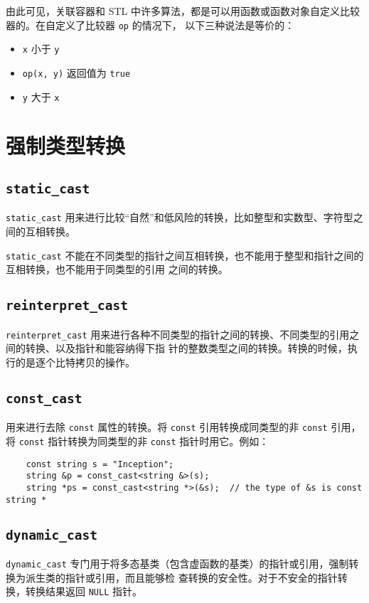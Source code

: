 \documentclass[UTF8]{ctexart}
\begin{document}
由此可见，关联容器和 STL 中许多算法，都是可以用函数或函数对象自定义比较器的。在自定义了比较器 \texttt{op} 的情况下，
以下三种说法是等价的：
\begin{itemize}
    \item \texttt{x} 小于 \texttt{y}
    \item \texttt{op(x, y)} 返回值为 \texttt{true}
    \item \texttt{y} 大于 \texttt{x}
\end{itemize}

\section{强制类型转换}
\subsection{\texttt{static\_cast}}
\texttt{static\_cast} 用来进行比较“自然”和低风险的转换，比如整型和实数型、字符型之间的互相转换。

\texttt{static\_cast} 不能在不同类型的指针之间互相转换，也不能用于整型和指针之间的互相转换，也不能用于同类型的引用
之间的转换。

\subsection{\texttt{reinterpret\_cast}}
\texttt{reinterpret\_cast} 用来进行各种不同类型的指针之间的转换、不同类型的引用之间的转换、以及指针和能容纳得下指
针的整数类型之间的转换。转换的时候，执行的是逐个比特拷贝的操作。

\subsection{\texttt{const\_cast}}
用来进行去除 \texttt{const} 属性的转换。将 \texttt{const} 引用转换成同类型的非 \texttt{const} 引用，将
\texttt{const} 指针转换为同类型的非 \texttt{const} 指针时用它。例如：
\begin{verbatim}
    const string s = "Inception";
    string &p = const_cast<string &>(s);
    string *ps = const_cast<string *>(&s);  // the type of &s is const string *
\end{verbatim}

\subsection{\texttt{dynamic\_cast}}
\texttt{dynamic\_cast} 专门用于将多态基类（包含虚函数的基类）的指针或引用，强制转换为派生类的指针或引用，而且能够检
查转换的安全性。对于不安全的指针转换，转换结果返回 \texttt{NULL} 指针。
\end{document}
